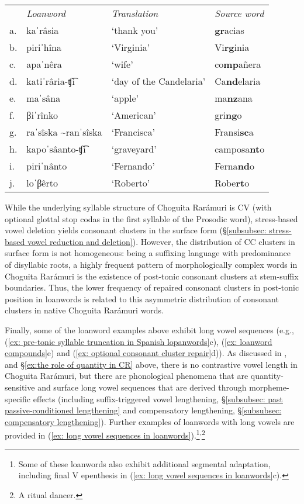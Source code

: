 \begin{tabular}{llll}
    & \textit{Loanword} & \textit{Translation} & \textit{Source word} \\
     a.& kaˈrâsia &  `thank you' & \textbf{gr}acias\\
     b.& piriˈhîna  & `Virginia' & Vi\textbf{rg}inia\\
     c.& apaˈnêra    & `wife' & co\textbf{mp}añera \\
     d.& katiˈrâria-ʧ͡i & `day of the Candelaria' & {Ca\textbf{nd}elaria} \\
     e.& maˈsâna &  `apple' & ma\textbf{nz}ana \\
     f.& βiˈrînko  & `American' & gri\textbf{ng}o\\
     g.& raˈsîska \textasciitilde ranˈsîska & `Francisca' & Fransi\textbf{sc}a\\
     h.& kapoˈsâanto-ʧ͡i &`graveyard' & camposa\textbf{nt}o \\
     i.& piriˈnânto & `Fernando' & Ferna\textbf{nd}o \\
     j.& loˈβêrto &  `Roberto' & Robe\textbf{rt}o \\
\end{tabular}
    \z

While the underlying syllable structure of Choguita Rarámuri is CV (with optional glottal stop codas in the first syllable of the Prosodic word), stress-based vowel deletion yields consonant clusters in the surface form (§\ref{subsubsec: stress-based vowel reduction and deletion}). However, the distribution of CC clusters in surface form is not homogeneous: being a suffixing language with predominance of disyllabic roots, a highly frequent pattern of morphologically complex words in Choguita Rarámuri is the existence of post-tonic consonant clusters at stem-suffix boundaries. Thus, the lower frequency of repaired consonant clusters in post-tonic position in  loanwords is related to this asymmetric distribution of consonant clusters in native Choguita Rarámuri words.

Finally, some of the loanword examples above exhibit long vowel sequences (e.g., (\ref{ex: pre-tonic syllable truncation in Spanish lopanwords}c), (\ref{ex: loanword compounds}e) and (\ref{ex: optional consonant cluster repair}d)). As discussed in ,  and §\ref{ex:the role of quantity in CR} above, there is no contrastive vowel length in Choguita Rarámuri, but there are phonological phenomena that are quantity-sensitive and surface long vowel sequences that are derived through morpheme-specific effects (including suffix-triggered vowel lengthening, §\ref{subsubsec: past passive-conditioned lengthening} and compensatory lengthening, §\ref{subsubsec: compensatory lengthening}). Further examples of loanwords with long vowels are provided in (\ref{ex: long vowel sequences in loanwords}).\footnote{Some of these loanwords also exhibit additional segmental adaptation, including final V epenthesis in (\ref{ex: long vowel sequences in loanwords}c).}\textsuperscript{,}\footnote{A ritual dancer.}

